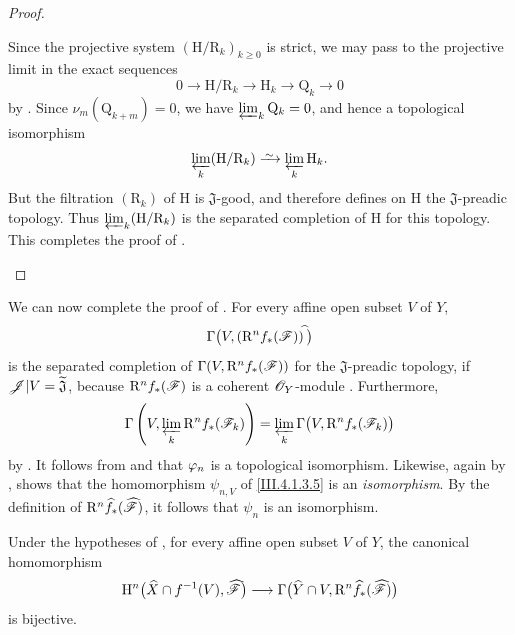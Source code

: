 \begin{proof}
\begin{env}[4.1.7.21]
Since the projective system
$(\mathrm{H}/\mathrm{R}_k)_{k\geq0}$ is strict, we may pass to the
projective limit in the exact sequences
\[
  0
  \longrightarrow
  \mathrm{H}/\mathrm{R}_k
  \longrightarrow
  \mathrm{H}_k
  \longrightarrow
  \mathrm{Q}_k
  \longrightarrow
  0
  \tag{4.1.7.22}
  \label{III.4.1.7.22}
\]
by .
Since $\nu_m(\mathrm{Q}_{k+m})=0$, we have $\varprojlim_k\mathrm{Q}_k=0$,
and hence a topological isomorphism
\[
  \varprojlim_k(\mathrm{H}/\mathrm{R}_k)
  \isoto
  \varprojlim_k\mathrm{H}_k.
\]
But the filtration $(\mathrm{R}_k)$ of $\mathrm{H}$ is
$\mathfrak{J}$-good, and therefore defines on $\mathrm{H}$ the
$\mathfrak{J}$-preadic topology.
Thus $\varprojlim_k(\mathrm{H}/\mathrm{R}_k)$ is the separated
completion of $\mathrm{H}$ for this topology.
This completes the proof of .
\end{env}
\end{proof}

\begin{env}[4.1.8]
\label{III.4.1.8}
We can now complete the proof of .
For every affine open subset $V$ of $Y$,
\[
  \Gamma\bigl(
    V,(\mathrm{R}^n f_*(\mathscr{F}))^{\widehat{\,}}
  \bigr)
\]
is the separated completion of
$\Gamma(V,\mathrm{R}^n f_*(\mathscr{F}))$ for the
$\mathfrak{J}$-preadic topology, if
$\mathscr{J}|V=\widetilde{\mathfrak{J}}$, because
$\mathrm{R}^n f_*(\mathscr{F})$ is a coherent $\mathscr{O}_Y$-module
.
Furthermore,
\[
  \Gamma\left(
    V,\varprojlim_k\mathrm{R}^n f_*(\mathscr{F}_k)
  \right)
  =
  \varprojlim_k
  \Gamma\bigl(V,\mathrm{R}^n f_*(\mathscr{F}_k)\bigr)
\]
by .
It follows from  and  that
$\varphi_n$ is a topological isomorphism.
Likewise, again by ,  shows that the
homomorphism $\psi_{n,V}$ of \eqref{III.4.1.3.5} is an \emph{isomorphism}.
By the definition of
$\mathrm{R}^n\widehat{f}_*(\widehat{\mathscr{F}})$, it follows that $\psi_n$ is
an isomorphism.
\end{env}

\begin{corollary}[4.1.9]
\label{III.4.1.9}
Under the hypotheses of , for every affine open
subset $V$ of $Y$, the canonical homomorphism
\[
  \mathrm{H}^n\bigl(
    \widehat{X}\cap f^{-1}(V),
    \widehat{\mathscr{F}}
  \bigr)
  \longrightarrow
  \Gamma\bigl(
    \widehat{Y}\cap V,
    \mathrm{R}^n\widehat{f}_*(\widehat{\mathscr{F}})
  \bigr)
\]
is bijective.
\end{corollary}

